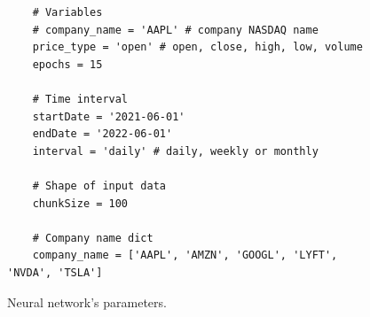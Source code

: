 \clearpage
\begin{figure}
\centering
\begin{lstlisting}
    # Variables
    # company_name = 'AAPL' # company NASDAQ name
    price_type = 'open' # open, close, high, low, volume
    epochs = 15

    # Time interval
    startDate = '2021-06-01'
    endDate = '2022-06-01'
    interval = 'daily' # daily, weekly or monthly

    # Shape of input data
    chunkSize = 100

    # Company name dict
    company_name = ['AAPL', 'AMZN', 'GOOGL', 'LYFT', 'NVDA', 'TSLA']
\end{lstlisting}
\caption{Neural network's parameters.}
\label{fig:pseudocode:listings}
\end{figure}

%
%
%
%
%        
